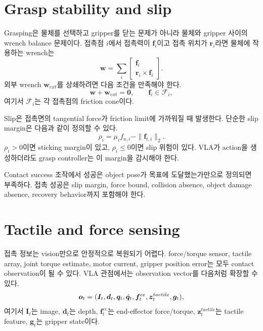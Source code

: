 \section{Grasp stability and slip}

Grasping은 물체를 선택하고 gripper를 닫는 문제가 아니라 물체와 gripper 사이의 wrench balance 문제이다. 접촉점 $i$에서 접촉력이 $\bm{f}_i$이고 접촉 위치가 $\bm{r}_i$라면 물체에 작용하는 wrench는
\begin{equation}
  \bm{w}
  =
  \sum_i
  \begin{bmatrix}
  \bm{f}_i \\
  \bm{r}_i \times \bm{f}_i
  \end{bmatrix}.
  \label{eq:contact-wrench}
\end{equation}
외부 wrench $\bm{w}_{ext}$를 상쇄하려면 다음 조건을 만족해야 한다.
\begin{equation}
  \bm{w} + \bm{w}_{ext} = \bm{0},
  \qquad
  \bm{f}_i \in \mathcal{F}_i,
  \label{eq:wrench-balance}
\end{equation}
여기서 $\mathcal{F}_i$는 각 접촉점의 friction cone이다.

Slip은 접촉면의 tangential force가 friction limit에 가까워질 때 발생한다. 단순한 slip margin은 다음과 같이 정의할 수 있다.
\begin{equation}
  \rho_i = \mu_i f_{n,i} - \|\bm{f}_{t,i}\|_2.
  \label{eq:slip-margin}
\end{equation}
$\rho_i > 0$이면 sticking margin이 있고, $\rho_i \le 0$이면 slip 위험이 있다. VLA가 action을 생성하더라도 grasp controller는 이 margin을 감시해야 한다.

\begin{definitionbox}{Contact success}
조작에서 성공은 object pose가 목표에 도달했는가만으로 정의되면 부족하다. 접촉 성공은 slip margin, force bound, collision absence, object damage absence, recovery behavior까지 포함해야 한다.
\end{definitionbox}

\section{Tactile and force sensing}

접촉 정보는 vision만으로 안정적으로 복원되기 어렵다. force/torque sensor, tactile array, joint torque estimate, motor current, gripper position error는 모두 contact observation이 될 수 있다. VLA 관점에서는 observation vector를 다음처럼 확장할 수 있다.
\begin{equation}
  \bm{o}_t =
  (\bm{I}_t,\bm{d}_t,\bm{q}_t,\dot{\bm{q}}_t,
  \bm{f}^{ee}_t,\bm{z}^{tactile}_t,\bm{g}_t),
  \label{eq:contact-observation}
\end{equation}
여기서 $\bm{I}_t$는 image, $\bm{d}_t$는 depth, $\bm{f}^{ee}_t$는 end-effector force/torque, $\bm{z}^{tactile}_t$는 tactile feature, $\bm{g}_t$는 gripper state이다.

